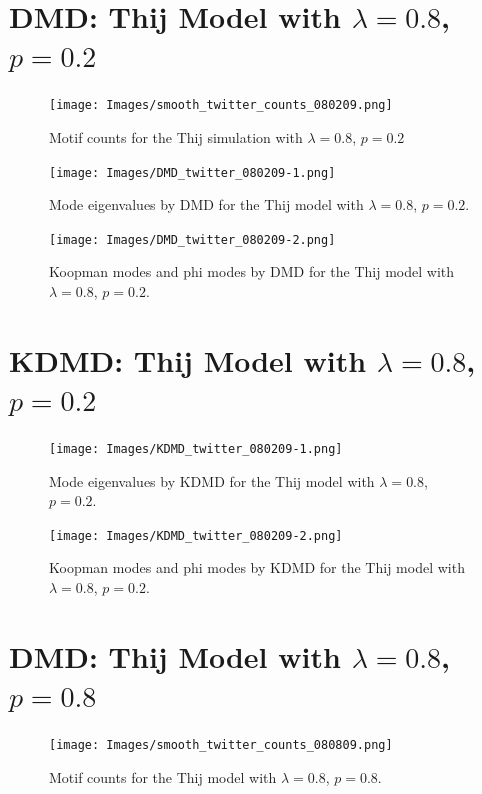 \section{DMD: Thij Model with $\lambda=0.8$, $p=0.2$}
\begin{figure}
    \texttt{[image: Images/smooth\_twitter\_counts\_080209.png]}
    \centering
    \caption{Motif counts for the Thij simulation with $\lambda=0.8$, $p=0.2$}
    \label{fig:pthij0802}
\end{figure}

\clearpage
\begin{figure}
    \texttt{[image: Images/DMD\_twitter\_080209-1.png]}
    \centering
    \caption{Mode eigenvalues by DMD for the Thij model
    with $\lambda=0.8$, $p=0.2$.}
\end{figure}

\begin{figure}
    \texttt{[image: Images/DMD\_twitter\_080209-2.png]}
    \centering
    \caption{Koopman modes and phi modes by DMD for the Thij model
    with $\lambda=0.8$, $p=0.2$.}
\end{figure}


\clearpage
\section{KDMD: Thij Model with $\lambda=0.8$, $p=0.2$}


\begin{figure}
    \texttt{[image: Images/KDMD\_twitter\_080209-1.png]}
    \centering
    \caption{Mode eigenvalues by KDMD for the Thij model
    with $\lambda=0.8$, $p=0.2$.}
\end{figure}

\begin{figure}
    \texttt{[image: Images/KDMD\_twitter\_080209-2.png]}
    \centering
    \caption{Koopman modes and phi modes by KDMD for the Thij model
    with $\lambda=0.8$, $p=0.2$.}
\end{figure}

\FloatBarrier

\clearpage

\section{DMD: Thij Model with $\lambda=0.8$, $p=0.8$}
\begin{figure}
    \texttt{[image: Images/smooth\_twitter\_counts\_080809.png]}
    \centering
    \caption{Motif counts for the Thij model with $\lambda=0.8$, $p=0.8$.}
    \label{fig:pthij0808}
\end{figure}

